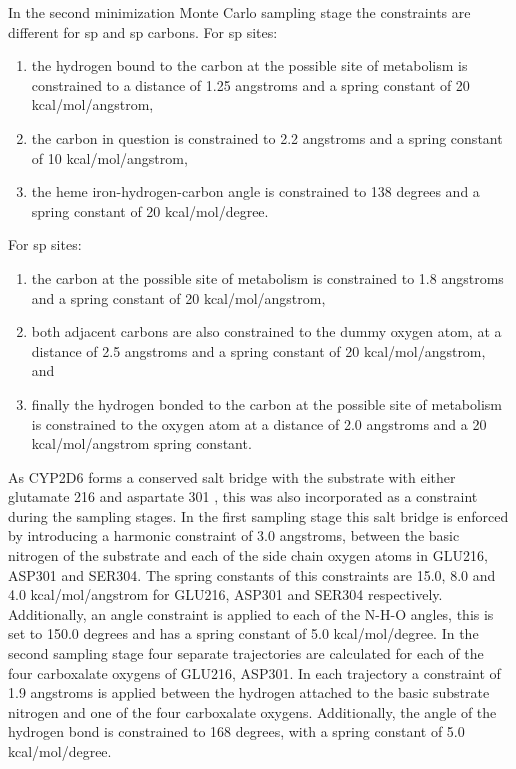 In the second minimization Monte Carlo sampling stage the constraints are different for sp and sp carbons.
For sp sites:
\begin{enumerate}
\item the hydrogen bound to the carbon at the possible site of metabolism is constrained to a distance of 1.25 angstroms and a spring constant of 20 kcal/mol/angstrom,
\item the carbon in question is constrained to 2.2 angstroms and a spring constant of 10 kcal/mol/angstrom,
\item the heme iron-hydrogen-carbon angle is constrained to 138 degrees and a spring constant of 20 kcal/mol/degree.
\end{enumerate}
For sp sites:
\begin{enumerate}
\item the carbon at the possible site of metabolism is constrained to 1.8 angstroms and a spring constant of 20 kcal/mol/angstrom,
\item both adjacent carbons are also constrained to the dummy oxygen atom, at a distance of 2.5 angstroms and a spring constant of 20 kcal/mol/angstrom, and
\item finally the hydrogen bonded to the carbon at the possible site of metabolism is constrained to the oxygen atom at a distance of 2.0 angstroms and a 20 kcal/mol/angstrom spring constant.
\end{enumerate}

As CYP2D6 forms a conserved salt bridge with the substrate with either glutamate 216 and aspartate 301 \cite{paine2003residues}, this was also incorporated as a constraint during the sampling stages.
In the first sampling stage this salt bridge is enforced by introducing a harmonic constraint of 3.0 angstroms, between the basic nitrogen of the substrate and each of the side chain oxygen atoms in GLU216, ASP301 and SER304.
The spring constants of this constraints are 15.0, 8.0 and 4.0 kcal/mol/angstrom for GLU216, ASP301 and SER304 respectively.
Additionally, an angle constraint is applied to each of the N-H-O angles, this is set to 150.0 degrees and has a spring constant of 5.0 kcal/mol/degree.
In the second sampling stage four separate trajectories are calculated for each of the four carboxalate oxygens of GLU216, ASP301.
In each trajectory a constraint of 1.9 angstroms is applied between the hydrogen attached to the basic substrate nitrogen and one of the four carboxalate oxygens.
Additionally, the angle of the hydrogen bond is constrained to 168 degrees, with a spring constant of 5.0 kcal/mol/degree.

